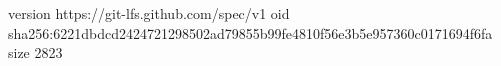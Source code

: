 version https://git-lfs.github.com/spec/v1
oid sha256:6221dbdcd2424721298502ad79855b99fe4810f56e3b5e957360c0171694f6fa
size 2823
